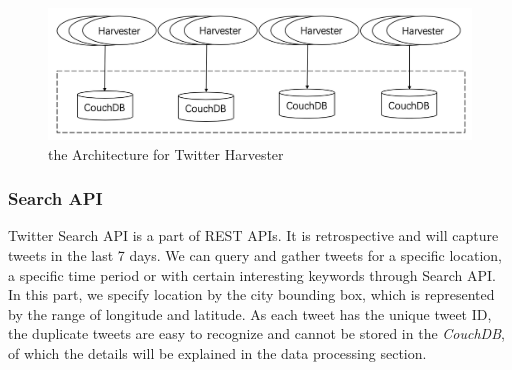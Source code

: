 \documentclass{article}
\begin{document}
\begin{figure}[htp]
\centering
\includegraphics[width=\textwidth]{img/harvester_architecture.jpg}
\caption{the Architecture for Twitter Harvester}
\label{fig:harvester_architecture}
\end{figure}

\subsubsection{Search API}
Twitter Search API is a part of REST APIs. It is retrospective and will capture tweets in the last 7 days. We can query and gather tweets for a specific location, a specific time period or with certain interesting keywords through Search API. In this part, we specify location by the city bounding box, which is represented by the range of longitude and latitude. As each tweet has the unique tweet ID, the duplicate tweets are easy to recognize and cannot be stored in the \textit{CouchDB}, of which the details will be explained in the data processing section.
\end{document}

